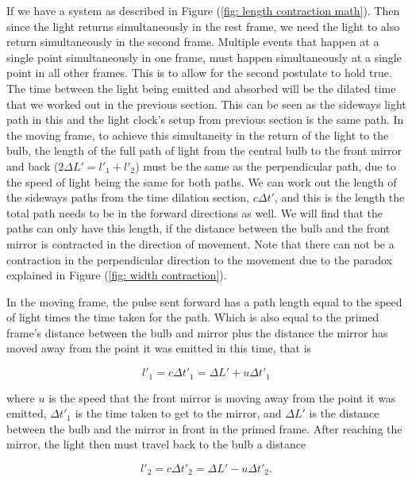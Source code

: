 If we have a system as described in Figure (\ref{fig: length contraction math}).
Then since the light returns simultaneously in the rest frame, we need the light to also return simultaneously in the second frame.
Multiple events that happen at a single point simultaneously in one frame, must happen simultaneously at a single point in all other frames.
This is to allow for the second postulate to hold true.
The time between the light being emitted and absorbed will be the dilated time that we worked out in the previous section.
This can be seen as the sideways light path in this and the light clock's setup from previous section is the same path.
In the moving frame, to achieve this simultaneity in the return of the light to the bulb, the length of the full path of light from the central bulb to the front mirror and back ($2 {\Delta L'} = {l'_1} + {l'_2}$) must be the same as the perpendicular path, due to the speed of light being the same for both paths.
We can work out the length of the sideways paths from the time dilation section, ${c}{\Delta t'}$, and this is the length the total path needs to be in the forward directions as well.
We will find that the paths can only have this length, if the distance between the bulb and the front mirror is contracted in the direction of movement.
Note that there can not be a contraction in the perpendicular direction to the movement due to the paradox explained in Figure (\ref{fig: width contraction}).

In the moving frame, the pulse sent forward has a path length equal to the speed of light times the time taken for the path.
Which is also equal to the primed frame's distance between the bulb and mirror plus the distance the mirror has moved away from the point it was emitted in this time, that is

\begin{equation}
	{l'_1} = {c}{\Delta t'_1} = {\Delta  L'} + {u} {\Delta t'_1}
\end{equation}

where ${u}$ is the speed that the front mirror is moving away from the point it was emitted, ${\Delta t'_1}$ is the time taken to get to the mirror, and ${\Delta  L'}$ is the distance between the bulb and the mirror in front in the primed frame.
After reaching the mirror, the light then must travel back to the bulb a distance

\begin{equation}
	{l'_2} = {c} {\Delta t'_2} = {\Delta  L'} - {u} {\Delta t'_2}.
\end{equation}

